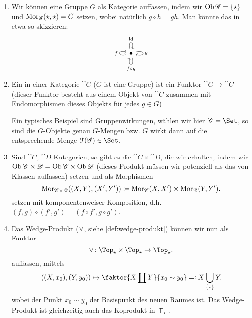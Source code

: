 \begin{example}
    \begin{enumerate}[1)]
        \item Wir können eine Gruppe $G$ als Kategorie auffassen, indem wir  $\operatorname{Ob}{\mathscr{G}} = \left \{\star\right\} $ und $\operatorname{Mor}_{\mathscr{G}}(\star,\star) = G$ setzen, wobei natürlich $g \circ  h = gh$. Man könnte das in etwa so skizzieren:
            \[
\begin{tikzcd}
            \bullet \ar[loop left]{}{f} \ar[loop above]{}{\id} \ar[loop right]{}{g} \ar[loop below]{}{f \circ g}
\end{tikzcd}
\]
\item Ein  in einer Kategorie $\cat{C}$ ($G$ ist eine Gruppe) ist ein Funktor  $\cat{G} \to  \cat{C}$ (dieser Funktor besteht aus einem Objekt von $\cat{C}$ zusammen mit Endomorphismen dieses Objekts für jedes $g\in G$)
    \begin{remark*}
        Ein typisches Beispiel sind Gruppenwirkungen, wählen wir hier $\cat{C} = \Set$, so sind die $G$-Objekte genau  $G$-Mengen bzw.  $G$ wirkt dann auf die entsprechende Menge  $\mathcal{F}(\cat{G})\in \Set$.
    \end{remark*}
\item Sind $\cat{C}$, $\cat{D}$ Kategorien, so gibt es die  $\cat{C} \times  \cat{D}$, die wir erhalten, indem wir $\operatorname{Ob}{\mathscr{C} \times \mathscr{D}} = \operatorname{Ob}{\mathscr{C}} \times \operatorname{Ob}{\mathscr{D}} $ (dieses Produkt müssen wir potenziell als das von Klassen auffassen) setzen und als Morphismen
    \[
        \operatorname{Mor}_{\mathscr{C}\times \mathscr{D}}((X,Y),(X',Y')) \coloneqq  \operatorname{Mor}_{\mathscr{C}}(X,X') \times \operatorname{Mor}_{\mathscr{D}}(Y,Y') 
    .\] 
    setzen mit komponentenweiser Komposition, d.h. $(f,g) \circ  (f', g') = (f \circ  f', g \circ  g')$.
\item Das Wedge-Produkt ($\vee$, siehe \autoref{def:wedge-produkt}) können wir nun als Funktor
     \[
    \twedge \colon \Top_{\star} \times \Top_{\star} \to  \Top_{\star}
    .\] 
    auffassen, mittels
    \[
        ((X,x_0),(Y,y_0)) \mapsto \faktor{X \coprod Y}{x_0 \sim  y_0} =\vcentcolon X \bigcup_{\left \{\star\right\} } Y 
    .\] 
    wobei der Punkt $x_0 \sim y_0$ der Basispunkt des neuen Raumes ist. Das Wedge-Produkt ist gleichzeitig auch das Koprodukt in $\Top_{\star}$.



\end{enumerate}
\end{example}
